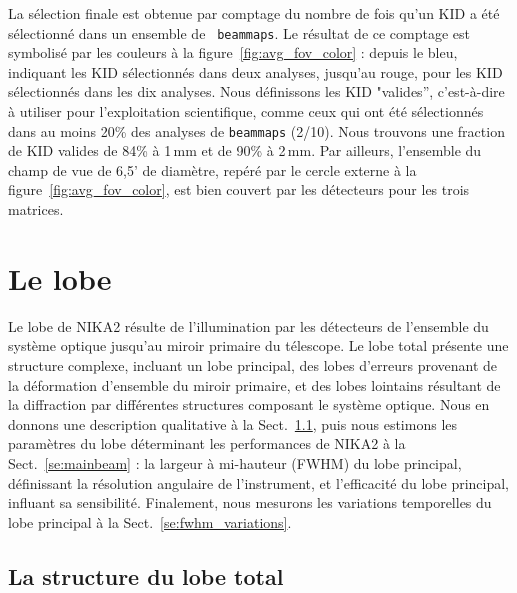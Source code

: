 La sélection finale est obtenue par comptage du nombre
de fois qu'un KID a été sélectionné dans un ensemble de {\tt
  beammaps}. Le résultat de ce comptage est symbolisé par les couleurs
à la figure~\ref{fig:avg_fov_color} : depuis le bleu, indiquant les KID
sélectionnés dans deux analyses, jusqu'au rouge, pour les KID
sélectionnés dans les dix analyses. Nous définissons les KID
"valides'', c'est-à-dire à utiliser pour l'exploitation scientifique,
comme ceux qui ont été sélectionnés dans au moins 20\% des analyses de
{\tt beammaps} (2/10). Nous trouvons une fraction de KID valides de
84\% à 1\,mm et de 90\% à 2\,mm. Par ailleurs, l'ensemble du champ de
vue de 6,5' de diamètre, repéré par le cercle externe à la
figure~\ref{fig:avg_fov_color}, est bien couvert par les détecteurs
pour les trois matrices. 




%
%
\section{Le lobe}
\label{se:beam}

Le lobe de NIKA2 résulte de l'illumination par les détecteurs de l'ensemble
du système optique jusqu'au miroir primaire du télescope. Le lobe
total présente une structure complexe, incluant un lobe principal, des
lobes d'erreurs provenant de la déformation d'ensemble du miroir
primaire, et des lobes lointains résultant de la diffraction par
différentes structures composant le système optique. Nous en donnons
une description qualitative à la Sect.~\ref{se:fullbeam}, puis nous
estimons les paramètres du lobe déterminant les performances de NIKA2
à la Sect.~\ref{se:mainbeam} : la largeur à mi-hauteur (FWHM) du lobe
principal, définissant la résolution angulaire de l'instrument, et
l'efficacité du lobe principal, influant sa sensibilité. Finalement,
nous mesurons les variations temporelles du lobe principal à la
Sect.~\ref{se:fwhm_variations}.


\subsection{La structure du lobe total}
\label{se:fullbeam}

